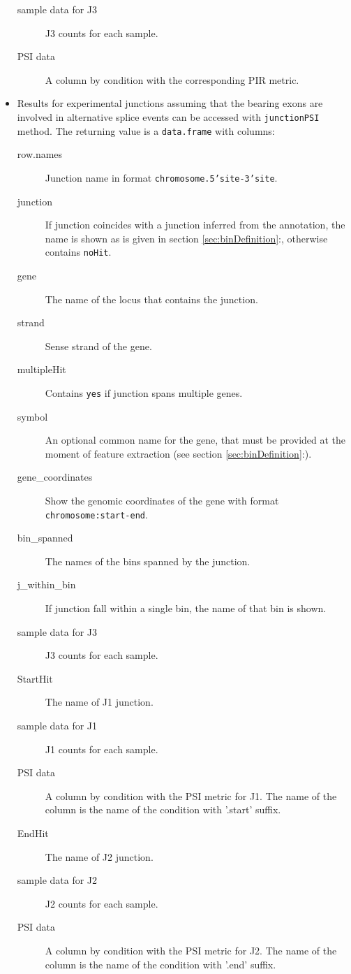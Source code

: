 \documentclass{article}
\newcommand{\secref}[1]{\ref{#1}:\nameref{#1}}
\begin{document}
\begin{itemize}
\begin{description}
      \item[sample data for J3] J3 counts for each sample.
      \item[PSI data] A column by condition with the corresponding PIR metric.
      \\
    \end{description}
  \item Results for experimental junctions assuming that the bearing
  exons are involved in alternative splice events can be accessed with
  \texttt{junctionPSI} method. The returning value is a \texttt{data.frame} with
  columns:
    \begin{description}
      \item[row.names] Junction name in format \texttt{chromosome.5'site-3'site}.
      \item[junction] If junction coincides with a junction inferred
      from the annotation, the name is shown as is given in section
      \ref{sec:binDefinition}:, otherwise
      contains \texttt{noHit}.
      \item[gene] The name of the locus that contains the junction.
      \item[strand] Sense strand of the gene.
      \item[multipleHit] Contains \texttt{yes} if junction spans multiple
      genes.
      \item[symbol] An optional common name for the gene, that must be provided at
      the moment of feature extraction (see section
      \secref{sec:binDefinition}).
      \item[gene\_coordinates] Show the genomic coordinates of the gene with
      format \texttt{chromosome:start-end}.
      \item[bin\_spanned] The names of the bins spanned by the junction.
      \item[j\_within\_bin] If junction fall within a single bin, the name of
      that bin is shown.
      \item[sample data for J3] J3 counts for each sample.
      \item[StartHit] The name of J1 junction.
      \item[sample data for J1] J1 counts for each sample.
      \item[PSI data] A column by condition with the PSI metric for J1. The name
      of the column is the name of the condition with '.start' suffix.
      \item[EndHit] The name of J2 junction.
      \item[sample data for J2] J2 counts for each sample.
      \item[PSI data] A column by condition with the PSI metric for J2. The name
      of the column is the name of the condition with '.end' suffix.
      \\
    \end{description}  

\end{itemize}
\end{document}
